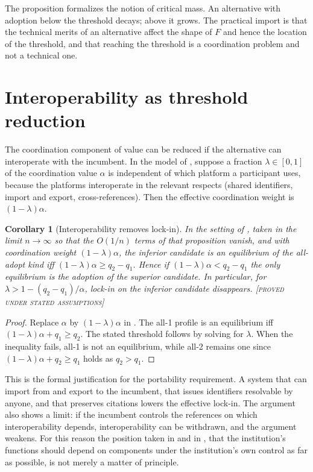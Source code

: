 \documentclass[11pt,twoside,openright]{book}
\theoremstyle{plain}
\newtheorem{corollary}[theorem]{Corollary}
\theoremstyle{definition}
\theoremstyle{remark}
\newcommand{\Proved}{\textup{\textsc{[proved under stated assumptions]}}}
\begin{document}
The proposition formalizes the notion of critical mass. An alternative with adoption below the threshold decays; above it grows. The practical import is that the technical merits of an alternative affect the shape of $F$ and hence the location of the threshold, and that reaching the threshold is a coordination problem and not a technical one.

\section{Interoperability as threshold reduction}

The coordination component of value can be reduced if the alternative can interoperate with the incumbent. In the model of , suppose a fraction $\lambda\in[0,1]$ of the coordination value $\alpha$ is independent of which platform a participant uses, because the platforms interoperate in the relevant respects (shared identifiers, import and export, cross-references). Then the effective coordination weight is $(1-\lambda)\alpha$.

\begin{corollary}[Interoperability removes lock-in]\label{cor:interop}
In the setting of , taken in the limit $n\to\infty$ so that the $O(1/n)$ terms of that proposition vanish, and with coordination weight $(1-\lambda)\alpha$, the inferior candidate is an equilibrium of the all-adopt kind iff $(1-\lambda)\alpha\ge q_2-q_1$. Hence if $(1-\lambda)\alpha<q_2-q_1$ the only equilibrium is the adoption of the superior candidate. In particular, for $\lambda>1-(q_2-q_1)/\alpha$, lock-in on the inferior candidate disappears.
\Proved{}
\end{corollary}

\begin{proof}
Replace $\alpha$ by $(1-\lambda)\alpha$ in . The all-1 profile is an equilibrium iff $(1-\lambda)\alpha+q_1\ge q_2$. The stated threshold follows by solving for $\lambda$. When the inequality fails, all-1 is not an equilibrium, while all-2 remains one since $(1-\lambda)\alpha+q_2\ge q_1$ holds as $q_2>q_1$.
\end{proof}

This is the formal justification for the portability requirement. A system that can import from and export to the incumbent, that issues identifiers resolvable by anyone, and that preserves citations lowers the effective lock-in. The argument also shows a limit: if the incumbent controls the references on which interoperability depends, interoperability can be withdrawn, and the argument weakens. For this reason the position taken in  and in , that the institution's functions should depend on components under the institution's own control as far as possible, is not merely a matter of principle.
\end{document}
